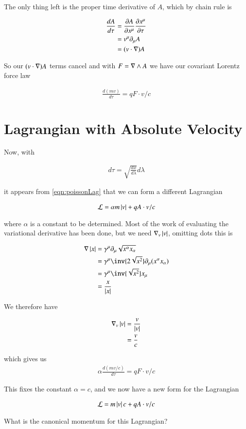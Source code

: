 \documentclass{article}
\begin{document}
The only thing left is the proper time derivative of $A$, which by chain rule is

\begin{align*}
\frac{d A}{d\tau} 
&=
\PD{x^\mu}{A} \PD{\tau}{x^\mu} \\
&=
v^\mu \partial_\mu A \\
&= (v \cdot \grad) A
\end{align*}

So our $(v \cdot \grad)A$ terms cancel and with $F = \grad \wedge A$ we have our covariant Lorentz force law

\begin{align}
\frac{d(mv)}{d\tau} = q F \cdot v/c 
\end{align}

\section{Lagrangian with Absolute Velocity}

Now, with

\begin{align*}
d\tau = \sqrt{\frac{dx}{d\lambda}} d\lambda
\end{align*}

it appears from
\ref{eqn:poissonLag}
that we can form a different Lagrangian

\begin{align}
\LL = \alpha m \Abs{v} + q A \cdot v/c
\end{align}

where $\alpha$ is a constant to be determined.  Most of the work of evaluating the variational derivative has been done, but we need $\grad_v \Abs{v}$, omitting dots this is

\begin{align*}
\grad \Abs{x}
&= \gamma^\mu \partial_\mu \sqrt{x^\alpha x_\alpha} \\
&= \gamma^\mu \inv{2 \sqrt{x^2}} \partial_\mu (x^\alpha x_\alpha) \\
&= \gamma^\mu \inv{\sqrt{x^2}} x_\mu \\
&= \frac{x}{\Abs{x}}
\end{align*}

We therefore have

\begin{align*}
\grad_v \Abs{v}
&= \frac{v}{\Abs{v}} \\
&= \frac{v}{c} \\
\end{align*}

which gives us
\begin{align}
\alpha \frac{d(mv/c)}{d\tau} = q F \cdot v/c 
\end{align}

This fixes the constant $\alpha = c$, and we now have a new form for the Lagrangian

\begin{align}
\LL = m \Abs{v} c + q A \cdot v/c
\end{align}

What is the canonical momentum for this Lagrangian?



\end{document}
